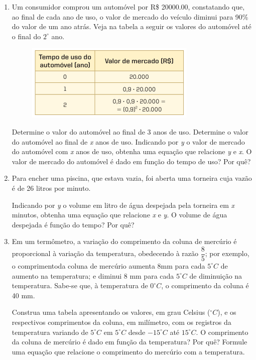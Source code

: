 \begin{enumerate}[label*=\protect\fbox{\arabic{enumi}}]
  \item Um consumidor comprou um automóvel por R\$ 20000.00, constatando que, ao final de cada ano de uso, o valor de mercado do veículo diminui para 90\% do valor de um ano atrás. 
    Veja na tabela a seguir os valores do automóvel até o final do $2^\circ$ ano. 
    \begin{figure}[H]
      \centering
      \includegraphics[width=.4\linewidth]{figures/6.png}
    \end{figure}

    \begin{tasks}
      \task Determine o valor do automóvel ao final de 3 anos de uso. 
      \task Determine o valor do automóvel ao final de \textit{x} anos de uso. 
      \task Indicando por \textit{y} o valor de mercado do automóvel com \textit{x} anos de uso, obtenha uma equação que relacione \textit{y} e \textit{x}. 
      \task O valor de mercado do automóvel é dado em função do tempo de uso? Por quê?
    \end{tasks}

  \item Para encher uma piscina, que estava vazia, foi aberta uma torneira cuja vazão é de 26 litros por minuto. 
    \begin{tasks}
      \task Indicando por \textit{y} o volume em litro de água despejada pela torneira em \textit{x} minutos, obtenha uma equação que relacione \textit{x} e \textit{y}.
      \task O volume de água despejada é função do tempo? Por quê?
    \end{tasks}

  \item Em um termômetro, a variação do comprimento da coluna de mercúrio é proporcional à variação da temperatura, obedecendo à razão $\dfrac{8}{5}$; por exemplo,
    o comprimentoda coluna de mercúrio aumenta 8mm para cada $5^\circ C$ de aumento na temperatura; e diminui 8 mm para cada $5^\circ C$ de diminuição na temperatura. 
    Sabe-se que, à temperatura de $0^\circ C$, o comprimento da coluna é 40 mm. 
    \begin{tasks}
      \task Construa uma tabela apresentando os valores, em grau Celsius ($^\circ C$), e os respectivos comprimentos da coluna, em milímetro, com os registros da temperatura 
      variando de $5^\circ C$ em $5^\circ C$ desde $-15^\circ C$ até $15^\circ C$.
      \task O comprimento da coluna de mercúrio é dado em função da temperatura? Por quê?
      \task Formule uma equação que relacione o comprimento do mercúrio com a temperatura.
    \end{tasks}
\end{enumerate}

